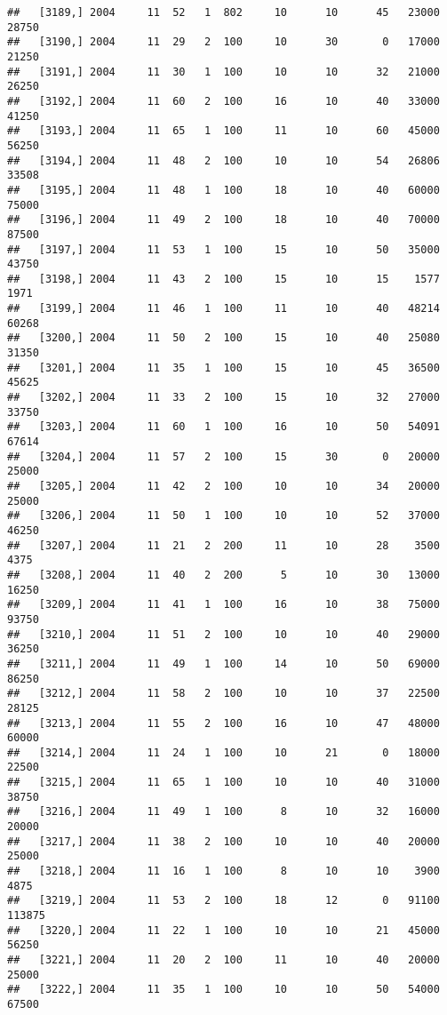 \documentclass{article}\usepackage[]{graphicx}\usepackage[]{color}
\makeatletter
\newenvironment{kframe}{%
 \def\at@end@of@kframe{}%
 \ifinner\ifhmode%
  \def\at@end@of@kframe{\end{minipage}}%
  \begin{minipage}{\columnwidth}%
 \fi\fi%
 \def\FrameCommand##1{\hskip\@totalleftmargin \hskip-\fboxsep
 \colorbox{shadecolor}{##1}\hskip-\fboxsep
     \hskip-\linewidth \hskip-\@totalleftmargin \hskip\columnwidth}%
 \MakeFramed {\advance\hsize-\width
   \@totalleftmargin\z@ \linewidth\hsize
   \@setminipage}}%
 {\par\unskip\endMakeFramed%
 \at@end@of@kframe}
\newenvironment{knitrout}{}{} %
\makeatother
\begin{document}
\begin{knitrout}
\begin{kframe}
\begin{verbatim}
##   [3189,] 2004     11  52   1  802     10      10      45   23000   28750
##   [3190,] 2004     11  29   2  100     10      30       0   17000   21250
##   [3191,] 2004     11  30   1  100     10      10      32   21000   26250
##   [3192,] 2004     11  60   2  100     16      10      40   33000   41250
##   [3193,] 2004     11  65   1  100     11      10      60   45000   56250
##   [3194,] 2004     11  48   2  100     10      10      54   26806   33508
##   [3195,] 2004     11  48   1  100     18      10      40   60000   75000
##   [3196,] 2004     11  49   2  100     18      10      40   70000   87500
##   [3197,] 2004     11  53   1  100     15      10      50   35000   43750
##   [3198,] 2004     11  43   2  100     15      10      15    1577    1971
##   [3199,] 2004     11  46   1  100     11      10      40   48214   60268
##   [3200,] 2004     11  50   2  100     15      10      40   25080   31350
##   [3201,] 2004     11  35   1  100     15      10      45   36500   45625
##   [3202,] 2004     11  33   2  100     15      10      32   27000   33750
##   [3203,] 2004     11  60   1  100     16      10      50   54091   67614
##   [3204,] 2004     11  57   2  100     15      30       0   20000   25000
##   [3205,] 2004     11  42   2  100     10      10      34   20000   25000
##   [3206,] 2004     11  50   1  100     10      10      52   37000   46250
##   [3207,] 2004     11  21   2  200     11      10      28    3500    4375
##   [3208,] 2004     11  40   2  200      5      10      30   13000   16250
##   [3209,] 2004     11  41   1  100     16      10      38   75000   93750
##   [3210,] 2004     11  51   2  100     10      10      40   29000   36250
##   [3211,] 2004     11  49   1  100     14      10      50   69000   86250
##   [3212,] 2004     11  58   2  100     10      10      37   22500   28125
##   [3213,] 2004     11  55   2  100     16      10      47   48000   60000
##   [3214,] 2004     11  24   1  100     10      21       0   18000   22500
##   [3215,] 2004     11  65   1  100     10      10      40   31000   38750
##   [3216,] 2004     11  49   1  100      8      10      32   16000   20000
##   [3217,] 2004     11  38   2  100     10      10      40   20000   25000
##   [3218,] 2004     11  16   1  100      8      10      10    3900    4875
##   [3219,] 2004     11  53   2  100     18      12       0   91100  113875
##   [3220,] 2004     11  22   1  100     10      10      21   45000   56250
##   [3221,] 2004     11  20   2  100     11      10      40   20000   25000
##   [3222,] 2004     11  35   1  100     10      10      50   54000   67500

\end{verbatim}
\end{kframe}
\end{knitrout}
\end{document}
